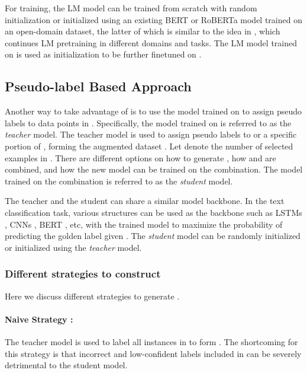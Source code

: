 \documentclass[11pt,a4paper]{article}
\begin{document}
For training, the LM model can be trained from scratch with random initialization or 
 initialized using an existing BERT or RoBERTa model trained on an open-domain dataset, the latter of which is similar to the idea in , which continues LM pretraining in different domains and tasks. 
 The LM model trained on  is used as initialization to be further finetuned on . 


\subsection{Pseudo-label Based Approach}
Another way to take advantage of  is to use the model trained on  to assign
pseudo
 labels to data points in . 
Specifically, 
the model trained on  is referred to as the {\it teacher} model. 
The teacher model is used to 
  assign pseudo labels to  or a specific portion  of , forming  the augmented  dataset . 
Let  denote the number of selected examples in  .
There are  different options on how to generate ,  how 
  and  are combined, and how the new model can be trained on the  combination. 
The model trained on the combination is referred to as the {\it student} model. 

The teacher  and the student can share a similar model backbone. 
In the  text classification task, various structures can be used as the backbone such as LSTMs \citep{hochreiter1997long,tang-etal-2016-effective}, 
CNNs \citep{kim-2014-convolutional}, BERT \cite{devlin2018bert,chai2020description}, etc, with the trained model to maximize the probability of 
predicting
the golden label  given . 
The {\it student} model can be randomly initialized or initialized using the {\it teacher} model. 


\subsubsection{Different strategies to construct }
Here we discuss different strategies to generate .
\paragraph{Naive Strategy :}
The teacher model is used to label all instances in  to form . 
The  shortcoming for this strategy is that incorrect and low-confident labels 
  included in 
  can be severely detrimental to the student model. 
\end{document}
